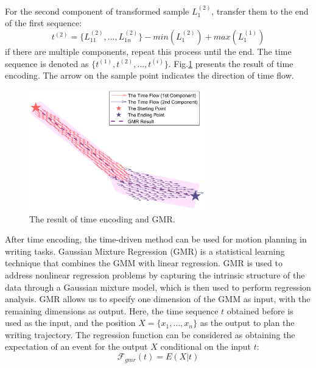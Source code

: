 \documentclass[journal]{IEEEtran}
\begin{document}
For the second component of transformed sample $L_{1}^{(2)}$, transfer them to the end of the first sequence:
\begin{equation}
    t^{(2)}=\{L_{11}^{(2)}, \hdots, L_{1n}^{(2)}\}-min(L_{1}^{(2)})+max(L_{1}^{(1)})
\end{equation}
if there are multiple components, repeat this process until the end. The time sequence is denoted as $\{t^{(1)},t^{(2)},\hdots,t^{(i)}\}$. Fig.\ref{fig4} presents the result of time encoding. The arrow on the sample point indicates the direction of time flow.
\begin{figure}[!t]
    \centering
    \includegraphics[width=3in]{./fig/fig4.pdf}
    \caption{The result of time encoding and GMR.}
    \label{fig4}
\end{figure}

After time encoding, the time-driven method can be used for motion planning in writing tasks. Gaussian Mixture Regression (GMR) is a statistical learning technique that combines the GMM with linear regression. GMR is used to address nonlinear regression problems by capturing the intrinsic structure of the data through a Gaussian mixture model, which is then used to perform regression analysis. GMR allows us to specify one dimension of the GMM as input, with the remaining dimensions as output. Here, the time sequence $t$ obtained before is used as the input, and the position $X=\{x_1,\hdots,x_n\}$ as the output to plan the writing trajectory. The regression function can be considered as obtaining the expectation of an event for the output $X$ conditional on the input $t$:
\begin{equation}
    \mathcal{F} _{gmr}(t)=E(X|t)
\end{equation}
\end{document}

